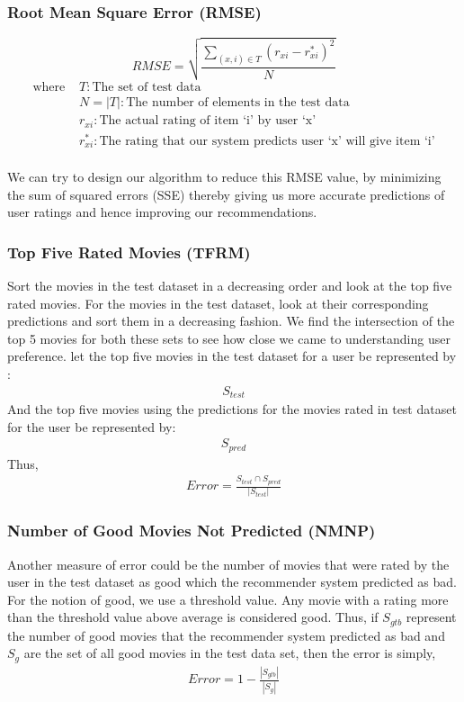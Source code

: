   \subsubsection{Root Mean Square Error (RMSE)}
\[ RMSE = \sqrt{\frac{\sum_{(x,i) \in T} (r_{xi} - r_{xi}^{*})^{2}}{N}} \]
\begin{align*}
\text{where } &T:\text{The set of test data} \\
&N = |T|:\text{The number of elements in the test data} \\
&r_{xi}:\text{The actual rating of item `i' by user `x'} \\
&r_{xi}^{*}:\text{The rating that our system predicts user `x' will give item `i'}
\end{align*}
\paragraph{}
We can try to design our algorithm to reduce this RMSE value, by minimizing the sum of squared errors (SSE) thereby giving us more accurate predictions of user ratings and hence improving our recommendations. 
  \subsubsection{Top Five Rated Movies (TFRM)}
  Sort the movies in the test dataset in a decreasing order and look at the top five rated movies. For the movies in the test dataset, look at their corresponding predictions and sort them in a decreasing fashion. We find the intersection of the top 5 movies for both these sets to see how close we came to understanding user preference. let  the top five movies in the test dataset for a user be represented by :
  \begin{align*}
  S_{test}
  \end{align*}
  And the top five movies using the predictions for the movies rated in test dataset for the user be represented by:
  \begin{align*}
  S_{pred}
  \end{align*}
  Thus, 
  \begin{align*}
  Error = \frac{S_{test} \cap S_{pred}}{|S_{test}|}
  \end{align*}
  \subsubsection{Number of Good Movies Not Predicted (NMNP)}
  Another measure of error could be the number of movies that were rated by the user in the test dataset as good which the recommender system predicted as bad. For the notion of good, we use a threshold value. Any movie with a rating more than the threshold value above average is considered good. Thus, if $S_{gtb}$ represent the number of good movies that the recommender system predicted as bad and $S_{g}$ are the set of all good movies in the test data set, then the error is simply, 
  \begin{align*}
  Error = 1 - \frac{|S_{gtb}|}{|S_{g}|}
  \end{align*}
